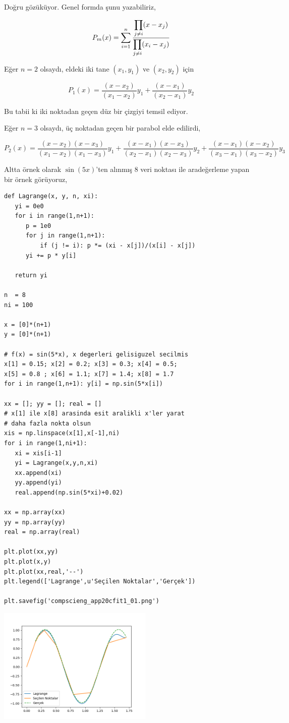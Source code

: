 \documentclass[12pt,fleqn]{article}\usepackage{../../common}
\begin{document}
Doğru gözüküyor. Genel formda şunu yazabiliriz,

$$
P_m (x) = \sum_{i=1}^{n}
\frac{\displaystyle \prod_{j \ne i} (x - x_j)}{\displaystyle \prod_{j \ne i} (x_i - x_j)}
$$

Eğer $n=2$ olsaydı, eldeki iki tane $(x_1,y_1)$ ve $(x_2,y_2)$ için

$$
P_1(x) =
\frac{(x-x_2)}{(x_1-x_2)} y_1 +
\frac{(x-x_1)}{(x_2-x_1)} y_2 
$$

Bu tabii ki iki noktadan geçen düz bir çizgiyi temsil ediyor.

Eğer $n=3$ olsaydı, üç noktadan geçen bir parabol elde edilirdi,

$$
P_2(x) =
\frac{(x-x_2)(x-x_3)}{(x_1-x_2)(x_1-x_3)} y_1 +
\frac{(x-x_1)(x-x_3)}{(x_2-x_1)(x_2-x_3)} y_2 +
\frac{(x-x_1)(x-x_2)}{(x_3-x_1)(x_3-x_2)} y_3
$$

Altta örnek olarak $\sin(5x)$'ten alınmış 8 veri noktası ile
aradeğerleme yapan bir örnek görüyoruz,

\begin{verbatim}
def Lagrange(x, y, n, xi):
   yi = 0e0
   for i in range(1,n+1):
      p = 1e0
      for j in range(1,n+1):
          if (j != i): p *= (xi - x[j])/(x[i] - x[j])
      yi += p * y[i]

   return yi

n  = 8  
ni = 100

x = [0]*(n+1)                                                   
y = [0]*(n+1)

# f(x) = sin(5*x), x degerleri gelisiguzel secilmis 
x[1] = 0.15; x[2] = 0.2; x[3] = 0.3; x[4] = 0.5;
x[5] = 0.8 ; x[6] = 1.1; x[7] = 1.4; x[8] = 1.7
for i in range(1,n+1): y[i] = np.sin(5*x[i])

xx = []; yy = []; real = []
# x[1] ile x[8] arasinda esit aralikli x'ler yarat
# daha fazla nokta olsun
xis = np.linspace(x[1],x[-1],ni)
for i in range(1,ni+1):
   xi = xis[i-1]
   yi = Lagrange(x,y,n,xi)
   xx.append(xi)
   yy.append(yi)
   real.append(np.sin(5*xi)+0.02)

xx = np.array(xx)
yy = np.array(yy)
real = np.array(real)

plt.plot(xx,yy)
plt.plot(x,y)
plt.plot(xx,real,'--')
plt.legend(['Lagrange',u'Seçilen Noktalar','Gerçek'])

plt.savefig('compscieng_app20cfit1_01.png')
\end{verbatim}

\includegraphics[width=20em]{compscieng_app20cfit1_01.png}
\end{document}

